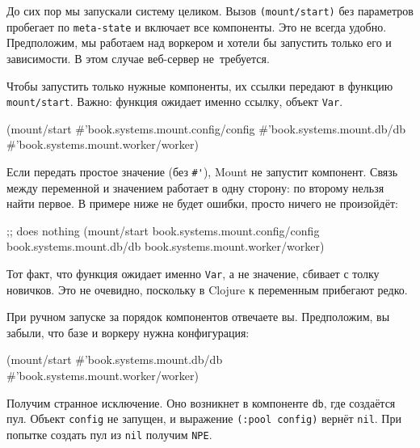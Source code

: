 \label{mount-selective}

До сих пор мы запускали систему целиком. Вызов \verb|(mount/start)| без
параметров пробегает по \verb|meta-state| и включает все компоненты. Это не
всегда удобно. Предположим, мы работаем над воркером и хотели бы запустить
только его и зависимости. В этом случае веб-сервер не~требуется.

Чтобы запустить только нужные компоненты, их ссылки передают в функцию
\verb|mount/start|. Важно: функция ожидает именно ссылку, объект \verb|Var|.

\begin{english}
  \begin{clojure}
(mount/start
  #'book.systems.mount.config/config
  #'book.systems.mount.db/db
  #'book.systems.mount.worker/worker)
  \end{clojure}
\end{english}

Если передать простое значение (без \verb|#'|), Mount не запустит
компонент. Связь между переменной и значением работает в одну сторону: по
второму нельзя найти первое. В примере ниже не будет ошибки, просто ничего не
произойдёт:

\begin{english}
  \begin{clojure}
;; does nothing
(mount/start
  book.systems.mount.config/config
  book.systems.mount.db/db
  book.systems.mount.worker/worker)
  \end{clojure}
\end{english}


Тот факт, что функция ожидает именно \verb|Var|, а не значение, сбивает с толку
новичков. Это не очевидно, поскольку в Clojure к переменным прибегают редко.

При ручном запуске за порядок компонентов отвечаете вы. Предположим, вы забыли,
что базе и воркеру нужна конфигурация:

\begin{english}
  \begin{clojure}
(mount/start
  #'book.systems.mount.db/db
  #'book.systems.mount.worker/worker)
  \end{clojure}
\end{english}

\noindent
Получим странное исключение. Оно возникнет в компоненте \verb|db|, где создаётся
пул. Объект \verb|config| не запущен, и выражение \verb|(:pool config)| вернёт
\verb|nil|. При попытке создать пул из \verb|nil| получим \verb|NPE|.


